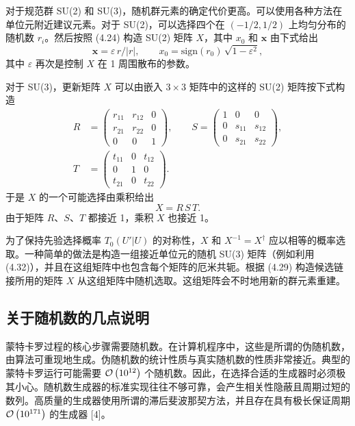 对于规范群 SU(2) 和 SU(3)，随机群元素的确定代价更高。可以使用各种方法在单位元附近建议元素。对于 SU(2)，可以选择四个在 $(-1/2, 1/2)$ 上均匀分布的随机数 $r_i$。然后按照 (4.24) 构造 SU(2) 矩阵 $X$，其中 $x_0$ 和 $\mathbf{x}$ 由下式给出
\begin{equation}
  \mathbf{x} = \varepsilon\,r/|r|, \qquad
  x_0 = \mathrm{sign}(r_0)\,\sqrt{1 - \varepsilon^2},
\end{equation}
其中 $\varepsilon$ 再次是控制 $X$ 在 1 周围散布的参数。

对于 SU(3)，更新矩阵 $X$ 可以由嵌入 $3\times3$ 矩阵中的这样的 SU(2) 矩阵按下式构造
\begin{equation}
  \begin{split}
    R &= \begin{pmatrix} r_{11} & r_{12} & 0 \\ r_{21} & r_{22} & 0 \\ 0 & 0 & 1 \end{pmatrix}, \qquad
    S = \begin{pmatrix} 1 & 0 & 0 \\ 0 & s_{11} & s_{12} \\ 0 & s_{21} & s_{22} \end{pmatrix}, \\
    T &= \begin{pmatrix} t_{11} & 0 & t_{12} \\ 0 & 1 & 0 \\ t_{21} & 0 & t_{22} \end{pmatrix}.
  \end{split}
\end{equation}
于是 $X$ 的一个可能选择由乘积给出
\begin{equation}
  X = R\,S\,T .
\end{equation}
由于矩阵 $R$、$S$、$T$ 都接近 1，乘积 $X$ 也接近 1。

为了保持先验选择概率 $T_0(U'|U)$ 的对称性，$X$ 和 $X^{-1} = X^\dagger$ 应以相等的概率选取。一种简单的做法是构造一组接近单位元的随机 SU(3) 矩阵（例如利用 (4.32)），并且在这组矩阵中也包含每个矩阵的厄米共轭。根据 (4.29) 构造候选链接所用的矩阵 $X$ 从这组矩阵中随机选取。这组矩阵会不时地用新的群元素重建。

\subsection{关于随机数的几点说明}

蒙特卡罗过程的核心步骤需要随机数。在计算机程序中，这些是所谓的伪随机数，由算法可重现地生成。伪随机数的统计性质与真实随机数的性质非常接近。典型的蒙特卡罗运行可能需要 $\mathcal{O}\left(10^{12}\right)$ 个随机数。因此，在选择合适的生成器时必须极其小心。随机数生成器的标准实现往往不够可靠，会产生相关性隐蔽且周期过短的数列。高质量的生成器使用所谓的滞后斐波那契方法，并且存在具有极长保证周期 $\mathcal{O}\left(10^{171}\right)$ 的生成器 [4]。

